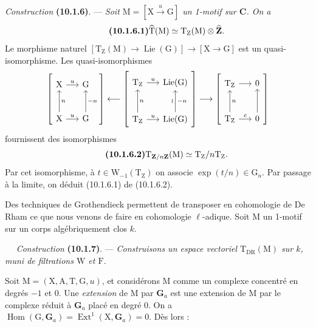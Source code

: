 \documentclass[11pt,leqno]{article}
\newcommand{\Page}[1]{\ifvmode\noindent\else\unskip\ \fi{\footnotesize\textcolor{gray}{[p.\,#1]}}\ \ignorespaces}
\begin{document}
\textit{Construction} \textbf{(10.1.6)}. —
\textit{Soit \(\mathrm{M}=[\mathrm{X}\xrightarrow{u}\mathrm{G}]\)
un 1-motif sur \(\mathbf{C}\). On a}
\[
\tag*{\textbf{(10.1.6.1)}}
\widehat{\mathrm{T}}(\mathrm{M})
\simeq\mathrm{T}_{\mathrm{Z}}(\mathrm{M})\otimes\widehat{\mathbf{Z}}.
\]
Le morphisme naturel
\([\mathrm{T}_{\mathrm{Z}}(\mathrm{M})\to\operatorname{Lie}(\mathrm{G})]
\to[\mathrm{X}\to\mathrm{G}]\) est un quasi-isomorphisme.
Les quasi-isomorphismes
\[
{
\left[
\begin{tikzcd}[ampersand replacement=\&, column sep=1.5em, row sep=2.6em]
\mathrm{X} \arrow[r, "u"] \& \mathrm{G}
\\
\mathrm{X} \arrow[r, "u"] \arrow[u, "n"']
\& \mathrm{G} \arrow[u, "-n"']
\end{tikzcd}
\right]
}
\longleftarrow
{
\left[
\begin{tikzcd}[ampersand replacement=\&, column sep=1.5em, row sep=2.6em]
\mathrm{T}_{\mathrm{Z}} \arrow[r, "u"]
\& \operatorname{Lie}(\mathrm{G})
\\
\mathrm{T}_{\mathrm{Z}} \arrow[r, "u"] \arrow[u, "n"']
\& \operatorname{Lie}(\mathrm{G}) \arrow[u, "\wr", "-n"']
\end{tikzcd}
\right]
}
\longrightarrow
{
\left[
\begin{tikzcd}[ampersand replacement=\&, column sep=1.5em, row sep=2.6em]
\mathrm{T}_{\mathrm{Z}} \arrow[r] \& 0
\\
\mathrm{T}_{\mathrm{Z}} \arrow[r, "c"] \arrow[u, "n"']
\& 0 \arrow[u]
\end{tikzcd}
\right]
}
\]
fournissent des isomorphismes
\[
\tag*{\textbf{(10.1.6.2)}}
\mathrm{T}_{\mathbf{Z}/n\mathbf{Z}}(\mathrm{M})
\simeq\mathrm{T}_{\mathrm{Z}}/n\mathrm{T}_{\mathrm{Z}}.
\]
Par cet isomorphisme, à \(t\in\mathrm{W}_{-1}(\mathrm{T}_{\mathrm{Z}})\)
on associe \(\exp(t/n)\in\mathrm{G}_n\). Par passage à la limite,
on déduit (10.1.6.1) de (10.1.6.2).

Des techniques de Grothendieck permettent de transposer en cohomologie
de De Rham ce que nous venons de faire en cohomologie \(\ell\)-adique.
Soit \(\mathrm{M}\) un 1-motif sur un corps algébriquement clos \(k\).

\Page{58}
\textit{Construction} \textbf{(10.1.7)}. —
\textit{Construisons un espace vectoriel
\(\mathrm{T}_{\mathrm{DR}}(\mathrm{M})\) sur \(k\), muni de filtrations
\(\mathrm{W}\) et \(\mathrm{F}\).}

Soit \(\mathrm{M}=(\mathrm{X},\mathrm{A},\mathrm{T},\mathrm{G},u)\),
et considérons \(\mathrm{M}\) comme un complexe concentré en degrés
\(-1\) et 0. Une \textit{extension} de \(\mathrm{M}\) par
\(\mathbf{G}_a\) est une extension de \(\mathrm{M}\) par le complexe
réduit à \(\mathbf{G}_a\) placé en degré 0. On a
\(\operatorname{Hom}(\mathrm{G},\mathbf{G}_a)
=\operatorname{Ext}^1(\mathrm{X},\mathbf{G}_a)=0\).
Dès lors :
\end{document}
